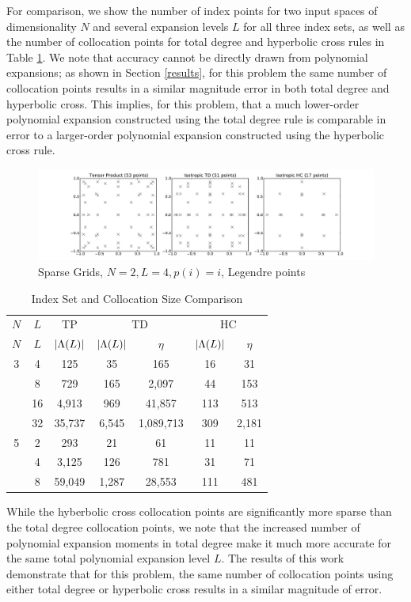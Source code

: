 \documentclass[11pt]{article}
\begin{document}
For comparison, we show the number of index points for two input spaces of dimensionality $N$ and several expansion levels $L$ for all three index sets, as well as the number of collocation points for total degree and hyperbolic cross rules in Table \ref{compIS}.  We note that accuracy cannot be directly drawn from polynomial expansions; as shown in Section \ref{results}, for this problem the same number of collocation points results in a similar magnitude error in both total degree and hyperbolic cross.  This implies, for this problem, that a much lower-order polynomial expansion constructed using the total degree rule is comparable in error to a larger-order polynomial expansion constructed using the hyperbolic cross rule.
\begin{figure}[H]
\centering
  \includegraphics[width=\linewidth]{sparse_plot}
  \caption{Sparse Grids, $N=2,L=4,p(i)=i$, Legendre points}
  \label{collsets}
\end{figure}
\begin{table}
\centering
\begin{tabular}{c|c|c|c c|c c}
$N$ & $L$ & TP & \multicolumn{2}{|c|}{TD} & \multicolumn{2}{|c}{HC} \\ 
$N$ & $L$ & $\qty|\Lambda(L)|$ & $\qty|\Lambda(L)|$ & $\eta$ & $\qty|\Lambda(L)|$ & $\eta$\\ \hline
3 & 4 & 125    & 35    & 165   & 16 & 31\\
 & 8   & 729    & 165  & 2,097  & 44 & 153\\
 & 16 & 4,913  & 969   & 41,857 & 113 & 513\\
 & 32 & 35,737 & 6,545 & 1,089,713 & 309 & 2,181\\ \hline
5 & 2 & 293 & 21 & 61 & 11 & 11\\
 & 4 & 3,125 & 126 & 781 & 31 & 71\\
 & 8 & 59,049 & 1,287 & 28,553 & 111 & 481 
\end{tabular}
\caption{Index Set and Collocation Size Comparison}
\label{compIS}
\end{table}
While the hyberbolic cross collocation points are significantly more sparse than the total degree collocation points, we note that the increased number of polynomial expansion moments in total degree make it much more accurate for the same total polynomial expansion level $L$.  The results of this work demonstrate that for this problem, the same number of collocation points using either total degree or hyperbolic cross results in a similar magnitude of error.
\end{document}

